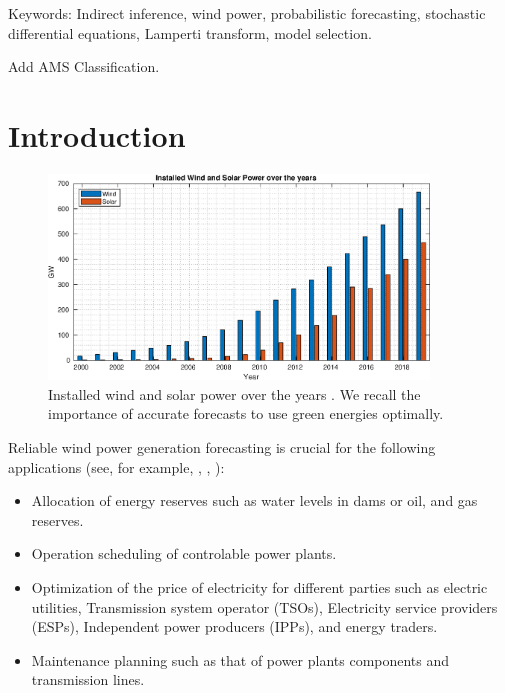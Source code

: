 \documentclass[11pt]{article}
\theoremstyle{definition}
\begin{document}
{\color{red}Keywords: Indirect inference, wind power, probabilistic forecasting, stochastic differential equations, Lamperti transform, model selection.}

{\color{red} Add AMS Classification.}



\section{Introduction}  \label{Section_1}

\begin{figure}[H]
\centering
\includegraphics[width=0.9\textwidth]{plots/wind_and_solar/plot_over_years.eps}
\caption{Installed wind and solar power over the years \cite{sultana2017review}. We recall the importance of accurate forecasts to use green energies optimally.}
\end{figure}

Reliable wind power generation forecasting is crucial for the following applications (see, for example, \cite[5]{gieb}, \cite[162]{chang}, \cite{zhbo}):
\begin{itemize}
\item Allocation of energy reserves such as water levels in dams or oil, and gas reserves.
\item Operation scheduling of controlable power plants.
\item Optimization of the price of electricity for different parties such as electric utilities, Transmission system operator (TSOs), Electricity service providers (ESPs), Independent power producers (IPPs), and energy traders.
\item Maintenance planning such as that of power plants components and transmission lines.

\end{itemize}
\end{document}
